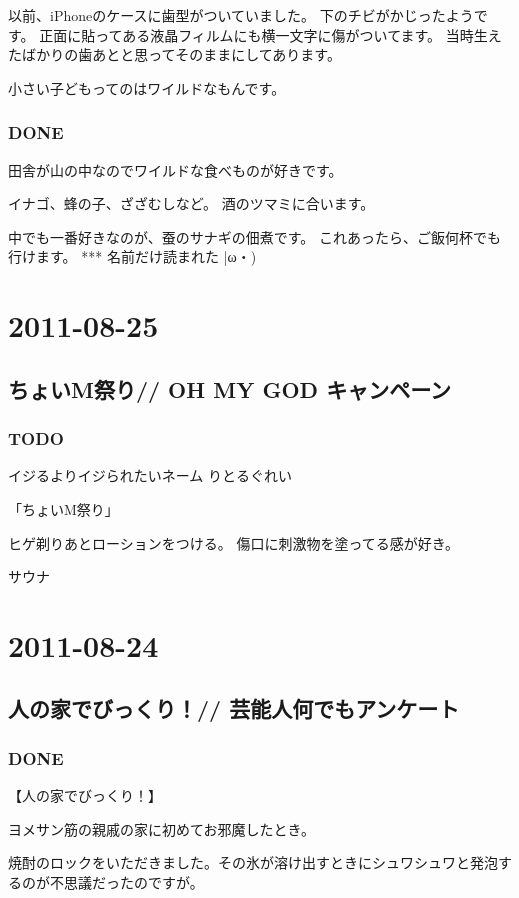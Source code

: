 \documentclass[11pt]{article}
\begin{document}
以前、iPhoneのケースに歯型がついていました。
下のチビがかじったようです。
正面に貼ってある液晶フィルムにも横一文字に傷がついてます。
当時生えたばかりの歯あとと思ってそのままにしてあります。

小さい子どもってのはワイルドなもんです。
\subsubsection{\textbf{DONE}}
\label{sec-77_1_3}

田舎が山の中なのでワイルドな食べものが好きです。

イナゴ、蜂の子、ざざむしなど。
酒のツマミに合います。

中でも一番好きなのが、蚕のサナギの佃煮です。
これあったら、ご飯何杯でも行けます。
***
名前だけ読まれた |ω・)
\section{2011-08-25}
\label{sec-78}
\subsection{ちょいM祭り// OH MY GOD キャンペーン}
\label{sec-78_1}
\subsubsection{\textbf{TODO}}
\label{sec-78_1_1}

イジるよりイジられたいネーム りとるぐれい

「ちょいM祭り」

ヒゲ剃りあとローションをつける。
傷口に刺激物を塗ってる感が好き。


サウナ
\section{2011-08-24}
\label{sec-79}
\subsection{人の家でびっくり！// 芸能人何でもアンケート}
\label{sec-79_1}
\subsubsection{\textbf{DONE}}
\label{sec-79_1_1}

【人の家でびっくり！】

ヨメサン筋の親戚の家に初めてお邪魔したとき。

焼酎のロックをいただきました。その氷が溶け出すときにシュワシュワと発泡するのが不思議だったのですが。
\end{document}
